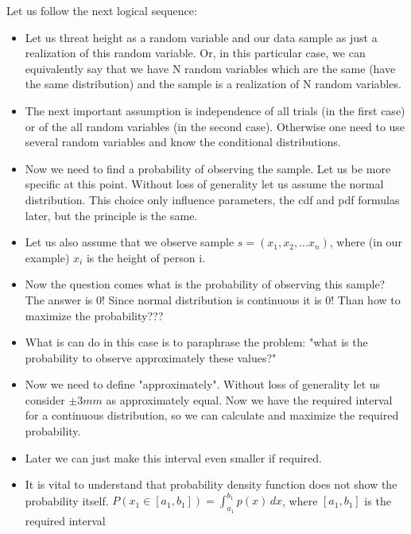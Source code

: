 \documentclass{article}
\begin{document}
Let us follow the next logical sequence:
\begin{itemize}
    \item Let us threat height as a random variable and our data sample as just a realization of this random variable. Or, in this particular case, we can equivalently say that we have N random variables which are the same (have the same distribution) and the sample is a realization of N random variables.
    \item The next important assumption is independence of all trials (in the first case) or of the all random variables (in the second case). Otherwise one need to use several random variables and know the conditional distributions.
    \item Now we need to find a probability of observing the sample. Let us be more specific at this point. Without loss of generality let us assume the normal distribution. This choice only influence parameters, the cdf and pdf formulas later, but the principle is the same.
    
    \item Let us also assume that we observe sample $s = (x_1,x_2,...x_n)$, where (in our example) $x_i$ is the height of person i.
    \item Now the question comes what is the probability of observing this sample? The answer is 0! Since normal distribution is continuous it is 0! Than how to maximize the probability???
    \item What is can do in this case is to paraphrase the problem: "what is the probability to observe approximately these values?"
    \item Now we need to define "approximately". Without loss of generality let us consider $\pm 3mm$ as approximately equal. Now we have the required interval for a continuous distribution, so we can calculate and maximize the required probability.
    \item Later we can just make this interval even smaller if required.
    \item It is vital to understand that probability density function does not show the probability itself.  $ P(x_1 \in [a_1,b_1]) = \int_{a_1}^{b_1} p(x) \,dx$, where $[a_1,b_1]$ is the required interval 
    
    
\end{itemize}
\end{document}

